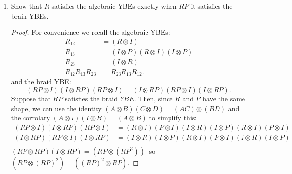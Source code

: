 \documentclass{article}
\begin{document}
\begin{enumerate}
\begin{proof}
\[\begin{pmatrix}
          R^2T & 0 & 0 &0\\
          0 & R^2 & 0 & 0\\
          0 & 0 & R^2 & 0\\
          0 & 0 & 0 & R^2
        \end{pmatrix}\]
        so this does indeed satisfy the Yang-Baxter equations.
      \end{proof}
      \item Show that $R$ satisfies the algebraic YBEs exactly when $RP$ it satisfies the brain YBEs.
      \begin{proof}
        For convenience we recall the algebraic YBEs:
        \begin{align*}
          R_{12} &= (R\otimes I)\\
          R_{13} & = (I\otimes P)(R\otimes I)(I\otimes P)\\
          R_{23} &= (I\otimes R)\\
          R_{12}R_{13}R_{23} &= R_{23}R_{13}R_{12}.
        \end{align*}
        and the braid YBE: \[(RP\otimes I)(I\otimes RP)(RP\otimes I) = (I\otimes RP)(RP\otimes I)(I\otimes RP).\]
        Suppose that $RP$ satisfies the braid $YBE.$ Then, since $R$ and $P$ have the same shape, we can use the identity $(A\otimes B)(C\otimes D) = (AC)\otimes (BD)$ and the corrolary $(A\otimes I)(I\otimes B) = (A\otimes B)$ to simplify this:
        \begin{align*}
          (RP\otimes I)(I\otimes RP)(RP\otimes I) &= (R\otimes I)(P\otimes I)(I\otimes R)(I\otimes P)(R\otimes I)(P\otimes I)\\
          (I\otimes RP)(RP\otimes I)(I\otimes RP) &=(I\otimes R)(I\otimes P)(R\otimes I)(P\otimes I)(I\otimes R)(I\otimes P)\\
        \end{align*}
        $(RP\otimes RP)(I\otimes RP) =  (RP\otimes (RP^2))$, so $(RP\otimes (RP)^2) = ((RP)^2 \otimes RP).$
      \end{proof} 
\end{enumerate}
\end{document}
